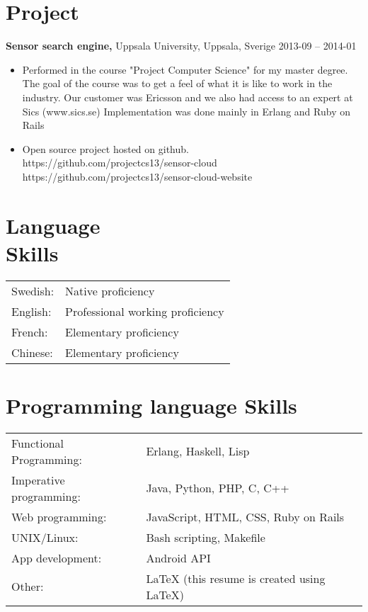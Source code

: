 \documentclass[margin]{res}
\begin{document}
\begin{resume}
\section{Project}
{\bf Sensor search engine,} Uppsala University, Uppsala, Sverige \hfill 2013-09 -- 2014-01
 \begin{itemize} \itemsep -2pt  %
 \item Performed in the course "Project Computer Science" for my master degree. The goal of the course was to get a feel of what it is like to work in the industry. Our customer was Ericsson and we also had access to an expert at Sics (www.sics.se)
Implementation was done mainly in Erlang and Ruby on Rails
 \item Open source project hosted on github. \\
 https://github.com/projectcs13/sensor-cloud\\
 https://github.com/projectcs13/sensor-cloud-website
 \end{itemize}

\section{Language \\ Skills}
   \begin{tabular}{l p{3in}}
    Swedish: & Native proficiency \\
    English: & Professional working proficiency \\
    French:  & Elementary proficiency \\
    Chinese:  & Elementary proficiency
 \end{tabular}

\section{Programming language Skills}
   \begin{tabular}{l p{3in}}
    Functional Programming: & Erlang, Haskell, Lisp \\
    Imperative programming: & Java, Python, PHP, C, C++ \\
    Web programming: & JavaScript, HTML, CSS, Ruby on Rails \\
    UNIX/Linux: & Bash scripting, Makefile \\
    App development: & Android API \\
    Other: & LaTeX (this resume is created using LaTeX)
 \end{tabular}


\end{resume}
\end{document}
